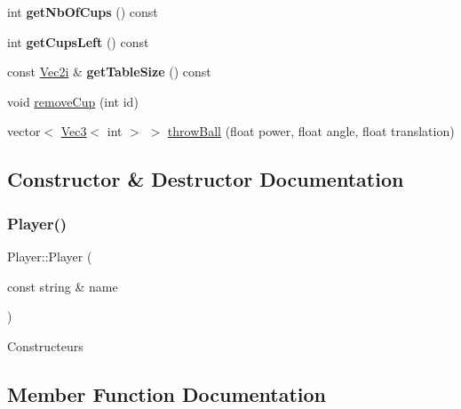 \begin{DoxyCompactItemize}
\item 
\mbox{\label{classPlayer_a6831b9956726a4af0faff62b5612c802}} 
int {\bfseries get\+Nb\+Of\+Cups} () const
\item 
\mbox{\label{classPlayer_a062331f31234693400b23a43ae4108f3}} 
int {\bfseries get\+Cups\+Left} () const
\item 
\mbox{\label{classPlayer_ac34d49b64e04bc2bb0cfb5cd2900312b}} 
const \mbox{\hyperlink{classVec2}{Vec2i}} \& {\bfseries get\+Table\+Size} () const
\item 
void \mbox{\hyperlink{classPlayer_aa7dba7ff02f3dbd9be8c4a5e4ad4ad29}{remove\+Cup}} (int id)
\item 
vector$<$ \mbox{\hyperlink{classVec3}{Vec3}}$<$ int $>$ $>$ \mbox{\hyperlink{classPlayer_a5591923f5d56cf30873ca8aa171c6b3f}{throw\+Ball}} (float power, float angle, float translation)
\end{DoxyCompactItemize}


\subsection{Constructor \& Destructor Documentation}
\mbox{\label{classPlayer_a5a2790fccf10c30106370d910c96d317}} 
\subsubsection{\texorpdfstring{Player()}{Player()}}
{\footnotesize\ttfamily Player\+::\+Player (\begin{DoxyParamCaption}\item[{const string \&}]{name }\end{DoxyParamCaption})\hspace{0.3cm}{\ttfamily [inline]}}

Constructeurs 

\subsection{Member Function Documentation}
\mbox{\label{classPlayer_afdd045ec6973c2e12a226d8976359182}} 
